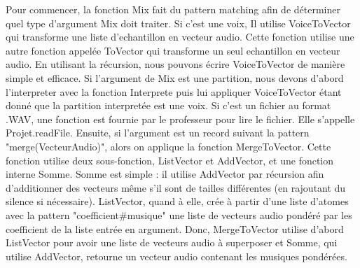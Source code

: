 \documentclass[a4paper,12pt]{article}
\begin{document}
Pour commencer, la fonction Mix fait du pattern matching afin de déterminer quel type d'argument Mix doit traiter.
Si c'est une voix, Il utilise VoiceToVector qui transforme une liste d'echantillon en vecteur audio. Cette fonction
utilise une autre fonction appelée ToVector qui transforme un seul echantillon en vecteur audio. En utilisant la récursion,
nous pouvons écrire VoiceToVector de manière simple et efficace. Si l'argument de Mix est une partition, nous devons d'abord
l'interpreter avec la fonction Interprete puis lui appliquer VoiceToVector étant donné que la partition interpretée est une voix.
Si c'est un fichier au format .WAV, une fonction est fournie par le professeur pour lire le fichier. Elle s'appelle
Projet.readFile. Ensuite, si l'argument est un record suivant la pattern "merge(VecteurAudio)", alors on applique la fonction
MergeToVector. Cette fonction utilise deux sous-fonction, ListVector et AddVector, et une fonction interne Somme. Somme est simple :
il utilise AddVector par récursion afin d'additionner des vecteurs même s'il sont de tailles différentes
(en rajoutant du silence si nécessaire). ListVector, quand à elle, crée à partir d'une liste d'atomes
avec la pattern "coefficient#musique" une liste de vecteurs audio pondéré par les coefficient de la liste entrée en argument.
Donc, MergeToVector utilise d'abord ListVector pour avoir une liste de vecteurs audio à superposer et Somme,
qui utilise AddVector, retourne un vecteur audio contenant les musiques pondérées.
\end{document}
